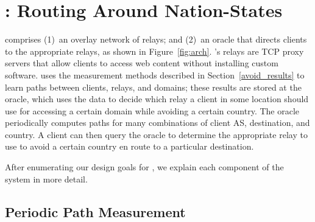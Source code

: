 \section{\system{}: Routing Around Nation-States}
\label{system_design}

\system{} comprises (1)~an overlay network of relays; and (2)~an oracle that
directs clients to the appropriate relays, as shown in Figure~\ref{fig:arch}.
\system{}'s relays are TCP proxy servers that allow clients to access web
content without installing custom software. \system{} uses the measurement
methods described in Section~\ref{avoid_results} to learn paths between
clients, relays, and domains; these results are stored at the oracle, which
uses the data to decide which relay a client in some location should use for
accessing a certain domain while avoiding a certain country.  The oracle
periodically computes paths for many combinations of client AS, destination,
and country.   A client can then query the oracle to determine the appropriate
relay to use to avoid a certain country en route to a particular destination.

After enumerating our design goals for \system{}, we explain each component of
the system in more detail. 





\subsection{Periodic Path Measurement}

